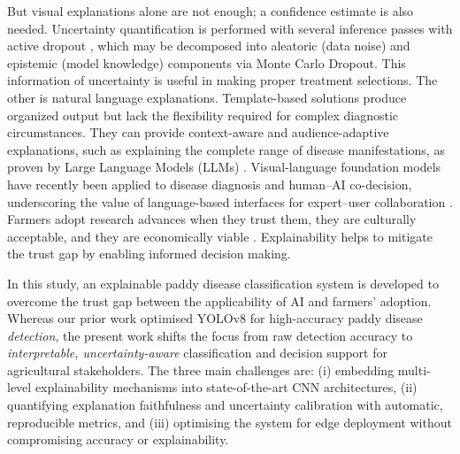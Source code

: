 \documentclass[pdflatex,sn-mathphys-num]{sn-jnl}%
\begin{document}
But visual explanations alone are not enough; a confidence estimate is also needed. Uncertainty quantification is performed with several inference passes with active dropout \cite{gal2016dropout}, which may be decomposed into aleatoric (data noise) and epistemic (model knowledge) components \cite{kendall2017uncertainties} via Monte Carlo Dropout. This information of uncertainty is useful in making proper treatment selections. The other is natural language explanations. Template-based solutions produce organized output but lack the flexibility required for complex diagnostic circumstances. They can provide context-aware and audience-adaptive explanations, such as explaining the complete range of disease manifestations, as proven by Large Language Models (LLMs) \cite{abdin2024phi3,zhou2025llmcrop,singh2024llmagri}. Visual-language foundation models have recently been applied to disease diagnosis and human--AI co-decision, underscoring the value of language-based interfaces for expert--user collaboration \cite{yao2025vlmdiagnosis}. Farmers adopt research advances when they trust them, they are culturally acceptable, and they are economically viable \cite{lee2004trust}. Explainability helps to mitigate the trust gap by enabling informed decision making.

In this study, an explainable paddy disease classification system is developed to overcome the trust gap between the applicability of AI and farmers' adoption. Whereas our prior work \cite{kumar2026yolo} optimised YOLOv8 for high-accuracy paddy disease \emph{detection}, the present work shifts the focus from raw detection accuracy to \emph{interpretable, uncertainty-aware} classification and decision support for agricultural stakeholders. The three main challenges are: (i) embedding multi-level explainability mechanisms into state-of-the-art CNN architectures, (ii) quantifying explanation faithfulness and uncertainty calibration with automatic, reproducible metrics, and (iii) optimising the system for edge deployment without compromising accuracy or explainability.
\end{document}

